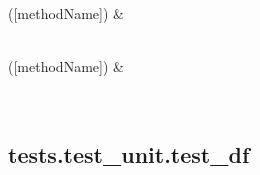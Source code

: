 \documentclass[letterpaper,10pt,english]{sphinxmanual}
\begin{document}
\begin{savenotes}\sphinxattablestart
\sphinxthistablewithglobalstyle
\sphinxthistablewithnovlinesstyle
\centering
\begin{tabulary}{\linewidth}[t]{}
\sphinxtoprule
\sphinxtableatstartofbodyhook
\sphinxAtStartPar
{\hyperref[\detokenize{_autosummary/tests.test_unit.test_df:tests.test_unit.test_df}]{}}({[}methodName{]})
&
\sphinxAtStartPar

\\
\sphinxhline
\sphinxAtStartPar
{\hyperref[\detokenize{_autosummary/tests.test_unit.test_sqlite:tests.test_unit.test_sqlite}]{}}({[}methodName{]})
&
\sphinxAtStartPar

\\
\sphinxbottomrule
\end{tabulary}
\sphinxtableafterendhook\par
\sphinxattableend\end{savenotes}

\sphinxstepscope


\subsection{tests.test\_unit.test\_df}
\label{\detokenize{_autosummary/tests.test_unit.test_df:tests-test-unit-test-df}}\label{\detokenize{_autosummary/tests.test_unit.test_df::doc}}
\end{document}
